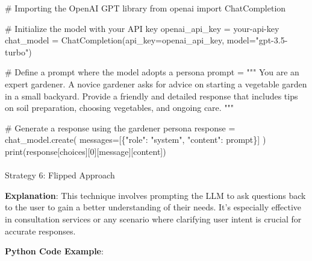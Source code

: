 \documentclass[
]{agujournal2019}
\makeatletter
\let\oldparagraph\paragraph
\renewcommand{\paragraph}{
    \@ifstar
      \xxxParagraphStar
      \xxxParagraphNoStar
  }
\newcommand{\xxxParagraphStar}[1]{\oldparagraph*{#1}\mbox{}}
\newcommand{\xxxParagraphNoStar}[1]{\oldparagraph{#1}\mbox{}}
\newenvironment{Shaded}{\begin{snugshade}}{\end{snugshade}}
\newcommand{\BuiltInTok}[1]{\textcolor[rgb]{0.00,0.23,0.31}{#1}}
\newcommand{\CommentTok}[1]{\textcolor[rgb]{0.37,0.37,0.37}{#1}}
\newcommand{\DecValTok}[1]{\textcolor[rgb]{0.68,0.00,0.00}{#1}}
\newcommand{\ImportTok}[1]{\textcolor[rgb]{0.00,0.46,0.62}{#1}}
\newcommand{\NormalTok}[1]{\textcolor[rgb]{0.00,0.23,0.31}{#1}}
\newcommand{\OperatorTok}[1]{\textcolor[rgb]{0.37,0.37,0.37}{#1}}
\newcommand{\StringTok}[1]{\textcolor[rgb]{0.13,0.47,0.30}{#1}}
\makeatother
\begin{document}
\begin{Shaded}
\begin{Highlighting}[]
\CommentTok{\# Importing the OpenAI GPT library}
\ImportTok{from}\NormalTok{ openai }\ImportTok{import}\NormalTok{ ChatCompletion}

\CommentTok{\# Initialize the model with your API key}
\NormalTok{openai\_api\_key }\OperatorTok{=} \StringTok{\textquotesingle{}your{-}api{-}key\textquotesingle{}}
\NormalTok{chat\_model }\OperatorTok{=}\NormalTok{ ChatCompletion(api\_key}\OperatorTok{=}\NormalTok{openai\_api\_key, model}\OperatorTok{=}\StringTok{"gpt{-}3.5{-}turbo"}\NormalTok{)}

\CommentTok{\# Define a prompt where the model adopts a persona}
\NormalTok{prompt }\OperatorTok{=} \StringTok{"""}
\StringTok{You are an expert gardener. A novice gardener asks for advice on starting a vegetable garden in a small backyard. Provide a friendly and detailed response that includes tips on soil preparation, choosing vegetables, and ongoing care.}
\StringTok{"""}

\CommentTok{\# Generate a response using the gardener persona}
\NormalTok{response }\OperatorTok{=}\NormalTok{ chat\_model.create(}
\NormalTok{    messages}\OperatorTok{=}\NormalTok{[\{}\StringTok{"role"}\NormalTok{: }\StringTok{"system"}\NormalTok{, }\StringTok{"content"}\NormalTok{: prompt\}]}
\NormalTok{)}
\BuiltInTok{print}\NormalTok{(response[}\StringTok{\textquotesingle{}choices\textquotesingle{}}\NormalTok{][}\DecValTok{0}\NormalTok{][}\StringTok{\textquotesingle{}message\textquotesingle{}}\NormalTok{][}\StringTok{\textquotesingle{}content\textquotesingle{}}\NormalTok{])}
\end{Highlighting}
\end{Shaded}

\paragraph{Strategy 6: Flipped
Approach}\label{strategy-6-flipped-approach}

\textbf{Explanation}: This technique involves prompting the LLM to ask
questions back to the user to gain a better understanding of their
needs. It's especially effective in consultation services or any
scenario where clarifying user intent is crucial for accurate responses.

\textbf{Python Code Example}:
\end{document}
